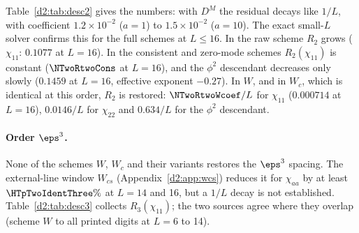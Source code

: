 Table~\ref{d2:tab:desc2} gives the numbers: with $D^M$ the residual decays like $1/L$, with coefficient $1.2\times10^{-2}$
($a=1$) to $1.5\times10^{-2}$ ($a=10$). The exact small-$L$ solver confirms this for the full schemes at $L\le16$. In the raw
scheme $R_2$ grows ($\chi_{11}$: $0.1077$ at $L=16$). In the consistent and zero-mode schemes $R_2(\chi_{11})$ is constant
($\NTwoRtwoCons$ at $L=16$), and the $\phi^2$ descendant decreases only slowly ($0.1459$ at $L=16$, effective exponent
$-0.27$). In $W$, and in $W_c$, which is identical at this order, $R_2$ is restored: $\NTwoRtwoWcoef/L$ for $\chi_{11}$
($0.000714$ at $L=16$), $0.0146/L$ for $\chi_{22}$ and $0.634/L$ for the $\phi^2$ descendant.

\paragraph{Order $\eps^3$.}\label{d2:app:desc3} None of the schemes $W$, $W_c$ and their variants restores the $\eps^3$
spacing. The external-line window $W_{cs}$ (Appendix~\ref{d2:app:wcs}) reduces it for $\chi_{aa}$ by at least
$\HTpTwoIdentThree\%$ at $L=14$ and 16, but a $1/L$ decay is not established.
Table~\ref{d2:tab:desc3} collects $R_3(\chi_{11})$; the two sources agree where they overlap (scheme $W$ to all printed digits
at $L=6$ to 14).

